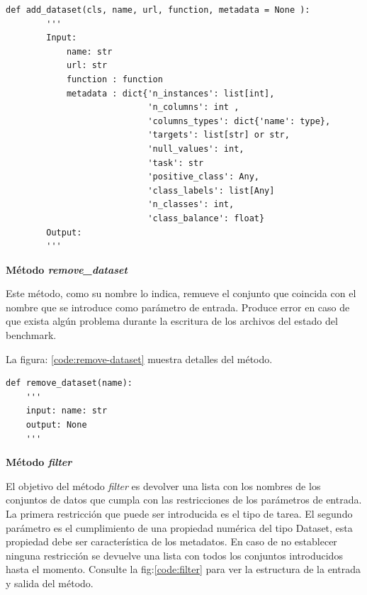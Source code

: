 \begin{lstlisting}[caption= Método add\_dataset, label= code:add-dataset]
    def add_dataset(cls, name, url, function, metadata = None ):
        '''
        Input:
            name: str
            url: str
            function : function
            metadata : dict{'n_instances': list[int],
                            'n_columns': int , 
                            'columns_types': dict{'name': type},
                            'targets': list[str] or str,
                            'null_values': int,
                            'task': str 
                            'positive_class': Any,
                            'class_labels': list[Any] 
                            'n_classes': int, 
                            'class_balance': float}
        Output: 
        ''' 
\end{lstlisting}

\begin{flushleft} 
    { \textbf{Método \textit{remove\_dataset} }}\label{method:remove}
\end{flushleft}
Este método, como su nombre lo indica, remueve el conjunto que coincida con el nombre que se introduce como parámetro de entrada. 
Produce error en caso de que exista algún problema durante la escritura de los archivos del estado del benchmark.

La figura: \ref{code:remove-dataset} muestra detalles del método.

\begin{lstlisting}[caption= Método remove\_dataset, label= code:remove-dataset]
def remove_dataset(name):
    '''
    input: name: str
    output: None
    '''
\end{lstlisting}

\begin{flushleft} 
    { \textbf{Método \textit{filter}}}\label{method:filter}
\end{flushleft}
El objetivo del método \textit{filter} es devolver una lista con los nombres de los conjuntos de datos que cumpla con las restricciones de los parámetros de entrada. 
La primera restricción que puede ser introducida es el tipo de tarea. El segundo parámetro es el cumplimiento de una propiedad numérica del tipo Dataset, esta propiedad 
debe ser característica de los metadatos. En caso de no establecer ninguna restricción se devuelve una lista con todos los conjuntos introducidos hasta el momento.
Consulte la fig:\ref{code:filter} para ver la estructura de la entrada y salida del método.

